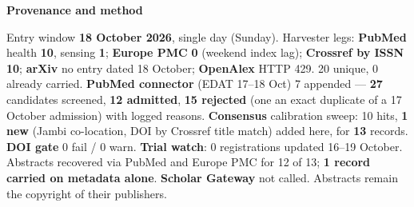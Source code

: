 \documentclass[10pt]{article}
\begin{document}


\vspace{2mm}

\begin{keybox}
{\sffamily\bfseries\footnotesize\color{Deep}Provenance and method}\\[1.2mm]
{\fontsize{7.2}{8.8}\selectfont
Entry window \textbf{18 October 2026}, single day (Sunday). Harvester legs: \textbf{PubMed} health
\textbf{10}, sensing \textbf{1}; \textbf{Europe PMC} \textbf{0} (weekend index lag); \textbf{Crossref by ISSN}
\textbf{10}; \textbf{arXiv} no entry dated 18 October; \textbf{OpenAlex} HTTP 429. 20 unique, 0 already carried.
\textbf{PubMed connector} (EDAT 17--18 Oct) 7 appended --- \textbf{27} candidates screened, \textbf{12 admitted},
\textbf{15 rejected} (one an exact duplicate of a 17 October admission) with logged reasons. \textbf{Consensus}
calibration sweep: 10 hits, \textbf{1 new} (Jambi co-location, DOI by Crossref title match) added here, for
\textbf{13} records. \textbf{DOI gate} 0 fail / 0 warn. \textbf{Trial watch}: 0 registrations updated 16--19
October. Abstracts recovered via PubMed and Europe PMC for 12 of 13; \textbf{1 record carried on metadata alone}.
\textbf{Scholar Gateway} not called. Abstracts remain the copyright of their publishers.\par}
\end{keybox}
\end{document}
